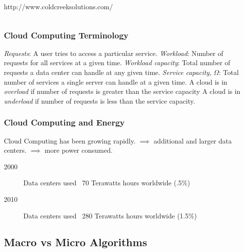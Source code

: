 \documentclass{beamer}
\begin{document}
\begin{frame}
\begin{columns}
\begin{column}{0.45\textwidth}
	\tiny{
		\begin{flushright}
			http://www.coldcreeksolutions.com/
		\end{flushright}
	}
\end{column}
\end{columns}
\end{frame}

\begin{frame}
  \frametitle{Cloud Computing Terminology}
	\emph{Requests}:	A user tries to access a particular service. 
	\linebreak
	\linebreak
	\emph{Workload}: Number of requests for all services at a given time.
	\linebreak
	\linebreak
	\emph{Workload capacity}: Total number of requests a data center can handle at any given time.
	\linebreak
	\linebreak
	\emph{Service capacity}, $\Omega$: Total number of services a single server can handle at a given time.
	\linebreak
	\linebreak
	A cloud is in \emph{overload} if number of requests is greater than the service capacity
	\linebreak
	\linebreak
	A cloud is in \emph{underload} if number of requests is less than the service capacity.
	

\end{frame}

\begin{frame}
  \frametitle{Cloud Computing and Energy}
 Cloud Computing has been growing rapidly.  
 \linebreak
 \linebreak
 $\implies$ additional and larger data centers.
 \linebreak
 \linebreak
 $\implies$ more power consumed.
 \begin{description}
 	\item[2000] Data centers used ~70 Terawatts hours worldwide (.5\%)
 	\item[2010] Data centers used ~280 Terawatts hours worldwide (1.5\%)
 \end{description}  

\end{frame}

\subsection[Macro vs Micro]{Macro vs Micro Algorithms}
\end{document}
